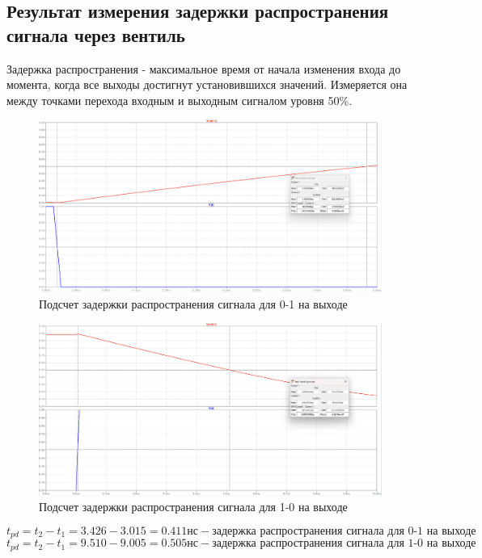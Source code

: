 \documentclass[12pt,onecolumn]{article}
\begin{document}
\subsection{Результат измерения задержки распространения сигнала через вентиль}
Задержка распространения - максимальное время от начала изменения входа до момента,
когда все выходы достигнут установившихся значений. Измеряется она между точками
перехода входным и выходным сигналом уровня 50\%.
\begin{figure}[H]
    \centering
    \includegraphics[width=\textwidth]{image/delay0-1.png}
    \caption{Подсчет задержки распространения сигнала для 0-1 на выходе}
\end{figure}
\begin{figure}[H]
    \centering
    \includegraphics[width=\textwidth]{image/delay1-0.png}
    \caption{Подсчет задержки распространения сигнала для 1-0 на выходе}
\end{figure}
$$
    t_{pd} = t_2 - t_1 = 3.426 - 3.015 = 0.411 \text{нс} - \text{задержка распространения сигнала для 0-1 на выходе}
$$
$$
    t_{pd} = t_2 - t_1 = 9.510 - 9.005 = 0.505 \text{нс} - \text{задержка распространения сигнала для 1-0 на выходе}
$$
\end{document}
